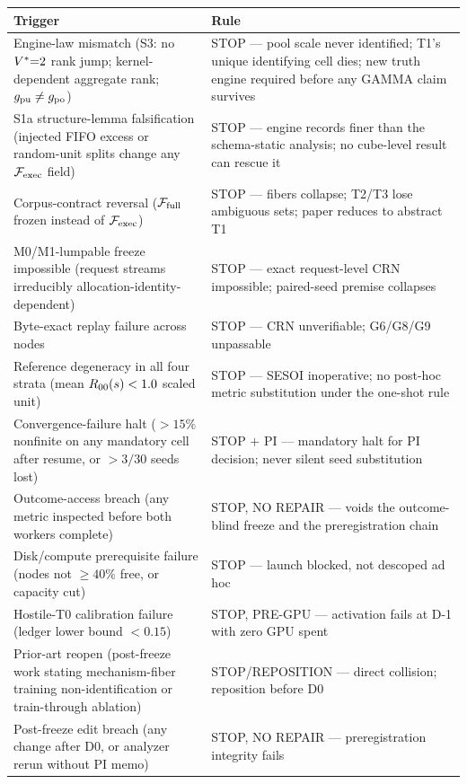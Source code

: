 \begin{table}[t]
\centering
\small
\begin{tabular}{p{6.4cm}p{8.6cm}}
\toprule
Trigger & Rule \\
\midrule
Engine-law mismatch (S3: no $V^{*}{=}2$ rank jump; kernel-dependent
aggregate rank; $g_{\mathrm{pu}} \neq g_{\mathrm{po}}$) & STOP --- pool scale never identified;
T1's unique identifying cell dies; new truth engine required before any
GAMMA claim survives \\
S1a structure-lemma falsification (injected FIFO excess or random-unit splits
change any $\mathcal{F}_{\mathrm{exec}}$ field) & STOP --- engine records finer than the
schema-static analysis; no cube-level result can rescue it \\
Corpus-contract reversal ($\mathcal{F}_{\mathrm{full}}$ frozen instead of $\mathcal{F}_{\mathrm{exec}}$) & STOP ---
fibers collapse; T2/T3 lose ambiguous sets; paper reduces to abstract T1 \\
M0/M1-lumpable freeze impossible (request streams irreducibly
allocation-identity-dependent) & STOP --- exact request-level CRN impossible;
paired-seed premise collapses \\
Byte-exact replay failure across nodes & STOP --- CRN unverifiable;
G6/G8/G9 unpassable \\
Reference degeneracy in all four strata (mean $R_{00}(s) < 1.0$ scaled unit) &
STOP --- SESOI inoperative; no post-hoc metric substitution under the
one-shot rule \\
Convergence-failure halt ($>15\%$ nonfinite on any mandatory cell after
resume, or $>3/30$ seeds lost) & STOP $+$ PI --- mandatory halt for PI
decision; never silent seed substitution \\
Outcome-access breach (any metric inspected before both workers complete) &
STOP, NO REPAIR --- voids the outcome-blind freeze and the preregistration
chain \\
Disk/compute prerequisite failure (nodes not $\ge 40\%$ free, or capacity
cut) & STOP --- launch blocked, not descoped ad hoc \\
Hostile-T0 calibration failure (ledger lower bound $< 0.15$) & STOP,
PRE-GPU --- activation fails at D-1 with zero GPU spent \\
Prior-art reopen (post-freeze work stating mechanism-fiber training
non-identification or train-through ablation) & STOP/REPOSITION --- direct
collision; reposition before D0 \\
Post-freeze edit breach (any change after D0, or analyzer rerun without PI
memo) & STOP, NO REPAIR --- preregistration integrity fails \\

\end{tabular}
\end{table}
